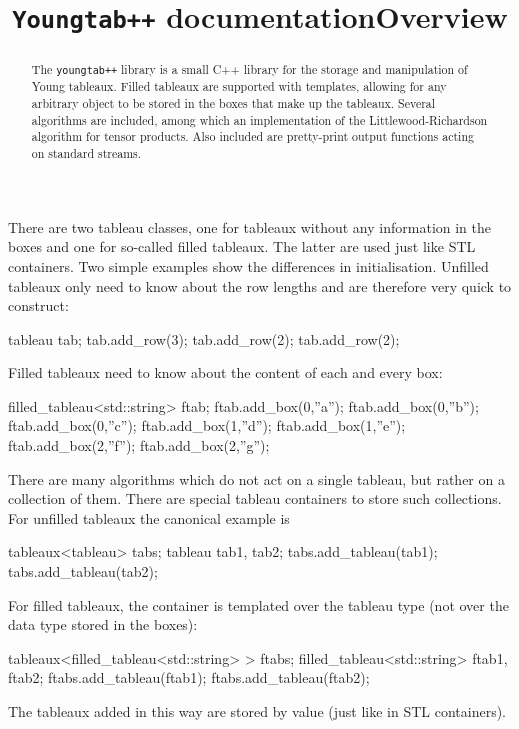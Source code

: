 \documentclass{kasper}
\newcommand{\ytt}{{\tt youngtab++}\xspace}
\newcommand{\Ytt}{{\tt Youngtab++}\xspace}
\begin{document}
\title{\Ytt documentation}
\maketitle
\begin{abstract}
The \ytt library is a small C++ library for the storage and
manipulation of Young tableaux. Filled tableaux are supported with
templates, allowing for any arbitrary object to be stored in the
boxes that make up the tableaux. Several algorithms are included, among
which an implementation of the Littlewood-Richardson algorithm for
tensor products. Also included are pretty-print output functions
acting on standard streams.
\end{abstract}
\begin{sectionunit}
\title{Overview}
\maketitle

There are two tableau classes, one for tableaux without any
information in the boxes and one for so-called filled tableaux. The
latter are used just like STL containers. Two simple examples show the
differences in initialisation. Unfilled tableaux only need to know
about the row lengths and are therefore very quick to construct:
\begin{screen}
tableau tab;
tab.add_row(3);
tab.add_row(2);
tab.add_row(2);
\end{screen}
Filled tableaux need to know about the content of each and every box:
\begin{screen}
filled_tableau<std::string> ftab;
ftab.add_box(0,''a'');
ftab.add_box(0,''b'');
ftab.add_box(0,''c'');
ftab.add_box(1,''d'');
ftab.add_box(1,''e'');
ftab.add_box(2,''f'');
ftab.add_box(2,''g'');
\end{screen}

There are many algorithms which do not act on a single tableau, but
rather on a collection of them. There are special tableau containers
to store such collections. For unfilled tableaux the canonical example is
\begin{screen}
tableaux<tableau> tabs;
tableau tab1, tab2;
tabs.add_tableau(tab1);
tabs.add_tableau(tab2);
\end{screen}
For filled tableaux, the container is templated over the tableau type
(not over the data type stored in the boxes):
\begin{screen}
tableaux<filled_tableau<std::string> > ftabs;
filled_tableau<std::string> ftab1, ftab2;
ftabs.add_tableau(ftab1);
ftabs.add_tableau(ftab2);
\end{screen}
The tableaux added in this way are stored by value (just like in STL
containers). 


\end{sectionunit}
\end{document}
